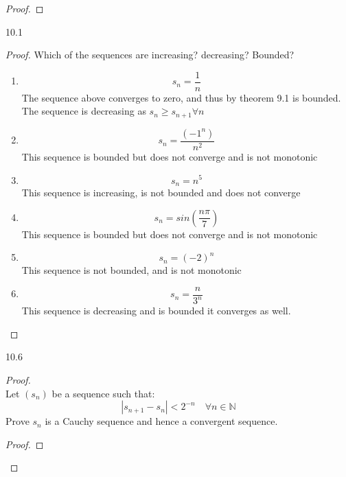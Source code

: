 \documentclass[11pt]{article}
\theoremstyle{definition}  %
\newcommand{\nlim}{\lim_{n\rightarrow \infty}}
\begin{document}
\begin{enumerate}
\begin{proof}
\begin{enumerate}
      \item
      \textbf{What is  $\nlim(\sum_{k=0}^na^k), a\geq 1}$}
      \begin{align*}
        &\nlim \left(\frac{1}{1-a}-\frac{a^{n+1}}{{1-a}}\right)\\
        &\left(\frac{1}{1-a}-\frac{\nlim a^{n+1}}{{1-a}}\right)\\
        &\left(\frac{1}{1-a}-\frac{\infty}{{1-a}}\right)=\infty\\
      \end{align*}
    \end{enumerate}
  \end{proof}
  \item 10.1
  \begin{proof}
    Which of the sequences are increasing? decreasing? Bounded?
    \begin{enumerate}
      \item
      \[
        s_n=\frac{1}{n}
      \]
      The sequence above converges to zero, and thus by theorem 9.1 is bounded. The sequence is decreasing as $s_n \geq s_{n+1} \forall n$
      \item
      \[
        s_n=\frac{(-1^n)}{n^2}
      \]
      This sequence is bounded but does not converge and is not monotonic
      \item
      \[
        s_n=n^5
      \]
      This sequence is increasing, is not bounded and does not converge
      \item
      \[
        s_n=sin(\frac{n\pi}{7})
      \]
      This sequence is bounded but does not converge and is not monotonic
      \item
      \[
        s_n=(-2)^n
      \]
      This sequence is not bounded, and is not monotonic
      \item
      \[
        s_n=\frac{n}{3^n}
      \]
      This sequence is decreasing and is bounded it converges as well.
    \end{enumerate}
  \end{proof}
  \item 10.6
  \begin{proof}
    \item\\
    Let $(s_n)$ be a sequence such that:
    \[
      |s_{n+1}-s_n|<2^{-n} \quad \forall n\in \mathbb{N}
    \]
    Prove $s_n$ is a Cauchy sequence and hence a convergent sequence.
    \begin{proof}

\end{proof}
\end{proof}
\end{enumerate}
\end{document}
